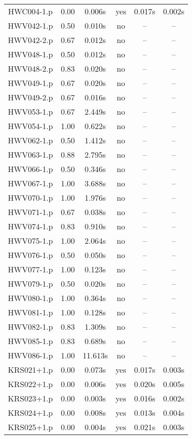 \begin{center}
\begin{longtable}{||c | c | c | c | c | c||}
HWC004-1.p & 0.00 & 0.006s & yes & 0.017s & 0.002s \\
HWV042-1.p & 0.50 & 0.010s & no & -- & -- \\
HWV042-2.p & 0.67 & 0.012s & no & -- & -- \\
HWV048-1.p & 0.50 & 0.012s & no & -- & -- \\
HWV048-2.p & 0.83 & 0.020s & no & -- & -- \\
HWV049-1.p & 0.67 & 0.020s & no & -- & -- \\
HWV049-2.p & 0.67 & 0.016s & no & -- & -- \\
HWV053-1.p & 0.67 & 2.449s & no & -- & -- \\
HWV054-1.p & 1.00 & 0.622s & no & -- & -- \\
HWV062-1.p & 0.50 & 1.412s & no & -- & -- \\
HWV063-1.p & 0.88 & 2.795s & no & -- & -- \\
HWV066-1.p & 0.50 & 0.346s & no & -- & -- \\
HWV067-1.p & 1.00 & 3.688s & no & -- & -- \\
HWV070-1.p & 1.00 & 1.976s & no & -- & -- \\
HWV071-1.p & 0.67 & 0.038s & no & -- & -- \\
HWV074-1.p & 0.83 & 0.910s & no & -- & -- \\
HWV075-1.p & 1.00 & 2.064s & no & -- & -- \\
HWV076-1.p & 0.50 & 0.050s & no & -- & -- \\
HWV077-1.p & 1.00 & 0.123s & no & -- & -- \\
HWV079-1.p & 0.50 & 0.020s & no & -- & -- \\
HWV080-1.p & 1.00 & 0.364s & no & -- & -- \\
HWV081-1.p & 1.00 & 0.128s & no & -- & -- \\
HWV082-1.p & 0.83 & 1.309s & no & -- & -- \\
HWV085-1.p & 0.83 & 0.689s & no & -- & -- \\
HWV086-1.p & 1.00 & 11.613s & no & -- & -- \\
KRS021+1.p & 0.00 & 0.073s & yes & 0.017s & 0.003s \\
KRS022+1.p & 0.00 & 0.006s & yes & 0.020s & 0.005s \\
KRS023+1.p & 0.00 & 0.003s & yes & 0.016s & 0.002s \\
KRS024+1.p & 0.00 & 0.008s & yes & 0.013s & 0.004s \\
KRS025+1.p & 0.00 & 0.004s & yes & 0.021s & 0.003s \\

\end{longtable}
\end{center}
